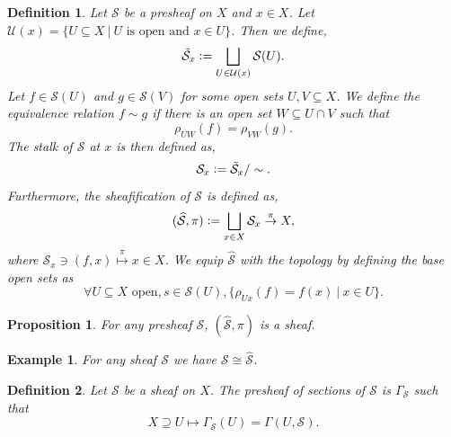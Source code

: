 \documentclass{article}
\newtheorem{proposition}{Proposition}[section]
\newtheorem{definition}{Definition}[section]
\newtheorem{example}{Example}[section]
\newcommand{\defeq}{\vcentcolon=}
\newcommand{\sep}[0]{\:|\:}
\begin{document}
\begin{definition}
  Let $\mathcal{S}$ be a presheaf on $X$ and $x\in X$. Let $\mathcal{U}(x) = \{U\subseteq X\sep \text{$U$ is open and $x\in U$}\}$. Then we define,
  \begin{equation*}
  \tilde{\mathcal{S}}_x \defeq \bigsqcup_{U\in\mathcal{U}(x)} \mathcal{S}(U).
  \end{equation*}
  Let $f\in\mathcal{S}(U)$ and $g\in\mathcal{S}(V)$ for some open sets $U,V\subseteq X$. We define the equivalence relation $f\sim g$ if there is an open set $W\subseteq U\cap V$ such that 
  \begin{equation*}
    \rho_{UW}(f) = \rho_{VW}(g).
  \end{equation*}
  The stalk of $\mathcal{S}$ at $x$ is then defined as,
  \begin{equation*}
  \mathcal{S}_x \defeq \tilde{\mathcal{S}}_x/\sim.
  \end{equation*}
  Furthermore, the sheafification of $\mathcal{S}$ is defined as,
  \begin{equation*}
  (\widehat{\mathcal{S}},\pi) \defeq\bigsqcup_{x\in X}\mathcal{S}_x \stackrel{\pi}{\to}X,
  \end{equation*}
  where $\mathcal{S}_x\ni(f,x)\stackrel{\pi}{\mapsto}x\in X$. We equip $\widehat{\mathcal{S}}$ with the topology by defining the base open sets as
  \begin{equation*}
    \forall U\subseteq X\text{ open}, s\in\mathcal{S}(U), \{\rho_{Ux}(f)=f(x)\sep x\in U\}.%
  \end{equation*}
\end{definition}

\begin{proposition}
  For any presheaf $\mathcal{S}$, $(\widehat{\mathcal{S}},\pi)$ is a sheaf.
\end{proposition}

\begin{example}
  For any sheaf $\mathcal{S}$ we have $\mathcal{S}\cong \widehat{\mathcal{S}}$. 
\end{example}

\begin{definition}
  Let $\mathcal{S}$ be a sheaf on $X$. The presheaf of sections of $\mathcal{S}$ is $\Gamma_\mathcal{S}$ such that 
  \begin{equation*}
    X\supseteq U \mapsto \Gamma_{\mathcal{S}}(U) = \Gamma(U,\mathcal{S}).
  \end{equation*}
\end{definition}
\end{document}
